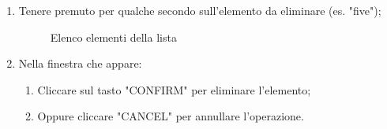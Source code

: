 \begin{itemize}
\begin{enumerate}
		\newpage
		\item Tenere premuto per qualche secondo sull'elemento da eliminare (es. "five");
		\begin{figure}[!ht]
			\centering
			\caption{Elenco elementi della lista}
		\end{figure}
		\item Nella finestra che appare:
		\begin{enumerate}
			\item Cliccare sul tasto "CONFIRM" per eliminare l'elemento;
			\item Oppure cliccare "CANCEL" per annullare l'operazione.
		\end{enumerate}

\end{enumerate}
\end{itemize}
